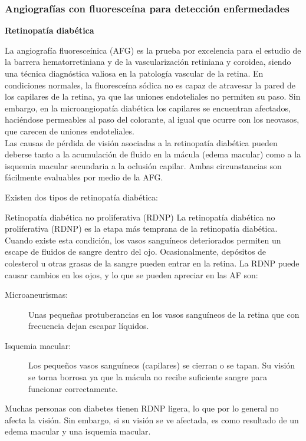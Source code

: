 






\subsubsection{Angiograf\'ias con fluoresce\'ina para detecci\'on enfermedades }


\textbf{Retinopat\'ia diab\'etica}



La angiograf\'ia fluoresce\'inica (AFG) es la prueba por excelencia para el estudio de la barrera hematorretiniana y de la vascularizaci\'on retiniana y coroidea, siendo una técnica diagnóstica valiosa en la patología vascular de la retina.
En condiciones normales, la fluoresceína sódica no es capaz de atravesar la pared de los capilares de la retina, ya que las uniones endoteliales no permiten su paso. Sin embargo, en la microangiopatía diabética los capilares se encuentran afectados, haciéndose permeables al paso del colorante, al igual que ocurre con los neovasos, que carecen de uniones endoteliales.
\\
Las causas de pérdida de visión asociadas a la retinopatía diabética pueden deberse tanto a la acumulación de fluido en la mácula (edema macular) como a la isquemia macular secundaria a la oclusión capilar. Ambas circunstancias son fácilmente evaluables por medio de la AFG.


Existen dos tipos de retinopatía diabética:

Retinopatía diabética no proliferativa (RDNP)
La retinopatía diabética no proliferativa (RDNP) es la etapa más temprana de la retinopatía diabética. Cuando existe esta condición, los vasos sanguíneos deteriorados permiten un escape de fluidos de sangre dentro del ojo. Ocasionalmente, depósitos de colesterol u otras grasas de la sangre pueden entrar en la retina.
La RDNP puede causar cambios en los ojos, y lo que se pueden apreciar en las AF son:
\begin{description}
    \item[Microaneurismas:] Unas pequeñas protuberancias en los vasos sanguíneos de la retina que con frecuencia dejan escapar líquidos.
    \item[Isquemia macular:] Los pequeños vasos sanguíneos (capilares) se cierran o se tapan. Su visión se torna borrosa ya que la mácula no recibe suficiente sangre para funcionar correctamente.
\end{description}
Muchas personas con diabetes tienen RDNP ligera, lo que por lo general no afecta la visión. Sin embargo, si su visión se ve afectada, es como resultado de un edema macular y una isquemia macular.

